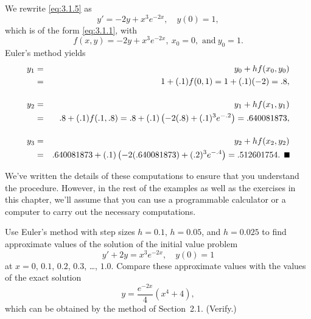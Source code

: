 \begin{examplesolution}
\solution We rewrite \eqref{eq:3.1.5} as
\[
  y'=-2y+x^{3}e^{-2x},\quad y(0)=1,
\]
which is of the form \eqref{eq:3.1.1}, with
\[
  f(x,y)=-2y+x^{3}e^{-2x},\ x_{0}=0,\mbox{\ and}\ y_{0}=1.
\]
Euler's method yields
\begin{eqnarray*}
  y_{1} & = & y_{0}+hf(x_{0},y_{0})                                                  \\
        & = & 1+(.1)f(0,1)=1+(.1)(-2)=.8,                                            \\[4\jot]
  y_{2} & = & y_{1}+hf(x_{1},y_{1})                                                  \\
        & = & .8+(.1)f(.1,.8)=.8+(.1)\left(-2(.8)+(.1)^{3}e^{-.2}\right)=.640081873, \\[4\jot]
  y_{3} & = & y_{2}+hf(x_{2},y_{2})                                                  \\
        & = & .640081873+(.1)\left(-2(.640081873)+(.2)^{3}e^{-.4}\right)=.512601754.\bbox
\end{eqnarray*}
\end{examplesolution}

We've written the details of these computations to ensure that you understand the procedure.
However, in the rest of the examples as well as the exercises in this chapter, we'll assume that you
can use a programmable calculator or a computer to carry out the necessary computations.

\medskip
{}

\begin{example}
  \label{example:3.1.2} \rm Use Euler's method with step sizes $h=0.1$, $h=0.05$, and $h=0.025$ to
  find approximate values of the solution of the initial value problem
  \[
    y'+2y=x^{3}e^{-2x},\quad y(0)=1
  \]
  at $x=0$, $0.1$, $0.2$, $0.3$, \dots, $1.0$. Compare these approximate values with the values of
  the exact solution
  \begin{equation}
    \label{eq:3.1.6}y=\frac{e^{-2x}}{4}(x^{4}+4),
  \end{equation}
  which can be obtained by the method of Section~2.1. (Verify.)
\end{example}

